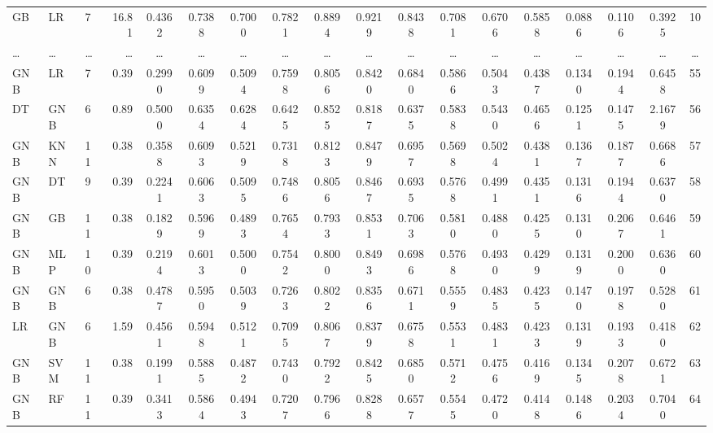 \begin{table}[H]
{\begin{tabular}{|p{1.3cm}|p{1.2cm}|p{1.4cm}|r|c|c|c|c|c|c|c|c|c|c|c|c|c|c|}
GB & LR & 7 & 16.81 & 0.4362 & 0.7388 & 0.7000 & 0.7821 & 0.8894 & 0.9219 & 0.8438 & 0.7081 & 0.6706 & 0.5858 & 0.0886 & 0.1106 & 0.3925 & 10 \\
\ldots & \ldots & \ldots & \ldots & \ldots & \ldots & \ldots & \ldots & \ldots & \ldots & \ldots & \ldots & \ldots & \ldots & \ldots & \ldots & \ldots & \ldots \\
GNB & LR & 7 & 0.39 & 0.2990 & 0.6099 & 0.5094 & 0.7598 & 0.8056 & 0.8420 & 0.6840 & 0.5866 & 0.5043 & 0.4387 & 0.1340 & 0.1944 & 0.6458
& 55 \\
DT & GNB & 6 & 0.89 & 0.5000 & 0.6354 & 0.6284 & 0.6425 & 0.8525 & 0.8187 & 0.6375 & 0.5838 & 0.5430 & 0.4656 & 0.1251 & 0.1475 & 2.1679 & 56 \\
GNB & KNN & 11 & 0.38 & 0.3588 & 0.6093 & 0.5219 & 0.7318 & 0.8123 & 0.8479 & 0.6957 & 0.5698 & 0.5024 & 0.4381 & 0.1367 & 0.1877 & 0.6686 & 57 \\
GNB & DT & 9 & 0.39 & 0.2241 & 0.6063 & 0.5095 & 0.7486 & 0.8056 & 0.8467 & 0.6935 & 0.5768 & 0.4991 & 0.4351 & 0.1316 & 0.1944 & 0.6370 & 58 \\
GNB & GB & 11 & 0.38 & 0.1829 & 0.5969 & 0.4893 & 0.7654 & 0.7933 & 0.8531 & 0.7063 & 0.5810 & 0.4880 & 0.4255 & 0.1310 & 0.2067 & 0.6461 & 59 \\
GNB & MLP & 10 & 0.39 & 0.2194 & 0.6013 & 0.5000 & 0.7542 & 0.8000 & 0.8493 & 0.6986 & 0.5768 & 0.4930 & 0.4299 & 0.1319 & 0.2000 & 0.6360 & 60 \\
GNB & GNB & 6 & 0.38 & 0.4787 & 0.5950 & 0.5039 & 0.7263& 0.8022 & 0.8356 & 0.6711 & 0.5559 & 0.4835 & 0.4235 & 0.1470 & 0.1978 & 0.5280 & 61 \\
LR & GNB & 6 & 1.59 & 0.4561 & 0.5948 & 0.5121 & 0.7095 & 0.8067 & 0.8379 & 0.6758 & 0.5531 & 0.4831 & 0.4233 & 0.1319 & 0.1933 & 0.4180 & 62 \\
GNB & SVM & 11 & 0.38 & 0.1991 & 0.5885 & 0.4872 & 0.7430 & 0.7922 & 0.8425 & 0.6850 & 0.5712 & 0.4756 & 0.4169 & 0.1345 & 0.2078 & 0.6721 & 63 \\
GNB & RF & 11 & 0.39 & 0.3413 & 0.5864 & 0.4943 & 0.7207 & 0.7966 & 0.8288 & 0.6577 & 0.5545 & 0.4720 & 0.4148 & 0.1486 & 0.2034 & 0.7040 & 64 \\
        \hline
        \bottomrule 
    \end{tabular}}
    \vspace{1em}

    \vspace{-1em}
\end{table}

